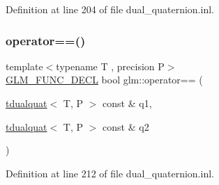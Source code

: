 Definition at line 204 of file dual\+\_\+quaternion.\+inl.

\mbox{\label{group__gtx__dual__quaternion_ga732a51a3a2029f72dd381210e76a3082}} 
\subsubsection{\texorpdfstring{operator==()}{operator==()}}
{\footnotesize\ttfamily template$<$typename T , precision P$>$ \\
\mbox{\hyperlink{setup_8hpp_ab2d052de21a70539923e9bcbf6e83a51}{G\+L\+M\+\_\+\+F\+U\+N\+C\+\_\+\+D\+E\+CL}} bool glm\+::operator== (\begin{DoxyParamCaption}\item[{\mbox{\hyperlink{structglm_1_1tdualquat}{tdualquat}}$<$ T, P $>$ const \&}]{q1,  }\item[{\mbox{\hyperlink{structglm_1_1tdualquat}{tdualquat}}$<$ T, P $>$ const \&}]{q2 }\end{DoxyParamCaption})}



Definition at line 212 of file dual\+\_\+quaternion.\+inl.


